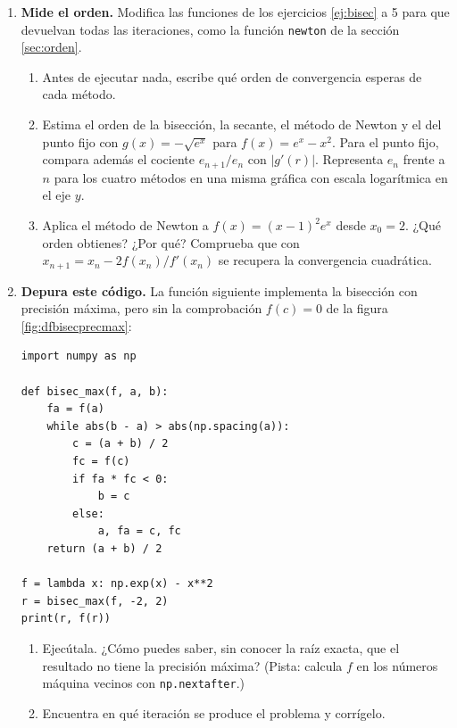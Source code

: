 \begin{enumerate}
\item \label{ej:orden} \textbf{Mide el orden.} Modifica las funciones de los ejercicios \ref{ej:bisec} a 5 para que devuelvan todas las iteraciones, como la función \texttt{newton} de la sección \ref{sec:orden}.
\begin{enumerate}
\item Antes de ejecutar nada, escribe qué orden de convergencia esperas de cada método.
\item Estima el orden de la bisección, la secante, el método de Newton y el del punto fijo con $g(x)=-\sqrt{e^x}$ para $f(x)=e^x-x^2$. Para el punto fijo, compara además el cociente $e_{n+1}/e_n$ con $\vert g'(r)\vert$. Representa $e_n$ frente a $n$ para los cuatro métodos en una misma gráfica con escala logarítmica en el eje $y$.
\item Aplica el método de Newton a $f(x)=(x-1)^2e^x$ desde $x_0=2$. ¿Qué orden obtienes? ¿Por qué? Comprueba que con $x_{n+1}=x_n-2f(x_n)/f'(x_n)$ se recupera la convergencia cuadrática.
\end{enumerate}

\item \textbf{Depura este código.} La función siguiente implementa la bisección con precisión máxima, pero sin la comprobación $f(c)=0$ de la figura \ref{fig:dfbisecprecmax}:
\begin{verbatim}
import numpy as np

def bisec_max(f, a, b):
    fa = f(a)
    while abs(b - a) > abs(np.spacing(a)):
        c = (a + b) / 2
        fc = f(c)
        if fa * fc < 0:
            b = c
        else:
            a, fa = c, fc
    return (a + b) / 2

f = lambda x: np.exp(x) - x**2
r = bisec_max(f, -2, 2)
print(r, f(r))
\end{verbatim}
\begin{enumerate}
\item Ejecútala. ¿Cómo puedes saber, sin conocer la raíz exacta, que el resultado no tiene la precisión máxima? (Pista: calcula $f$ en los números máquina vecinos con \texttt{np.nextafter}.)
\item Encuentra en qué iteración se produce el problema y corrígelo.
\end{enumerate}


\end{enumerate}
